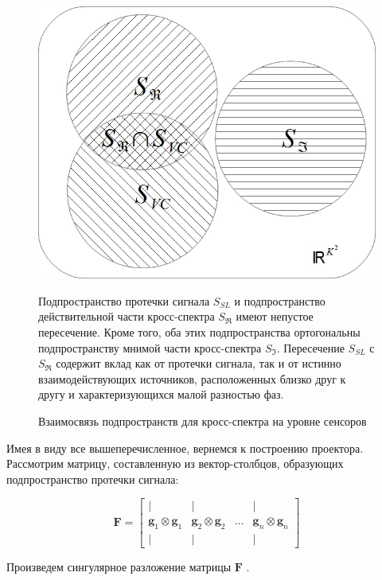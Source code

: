 \begin{figure}[htbp]
\centering
\includegraphics[width=12cm]{./images/SetsReImVC.jpg}
\caption{Взаимосвязь подпространств для кросс-спектра на уровне сенсоров}
\medskip
\small
Подпространство протечки сигнала $S_{SL}$ и подпространство действительной части кросс-спектра $S_{\Re}$
имеют непустое пересечение. Кроме того, оба этих подпространства ортогональны подпространству мнимой
части кросс-спектра $S_{\Im}$.
Пересечение $S_{SL}$ с $S_{\Re}$ содержит вклад как от протечки сигнала,
так и от истинно взаимодействующих источников,
расположенных близко друг к другу и характеризующихся малой разностью фаз.
\label{fig:subspaces}
\end{figure}%
Имея в виду все вышеперечисленное, вернемся к построению проектора.
Рассмотрим матрицу, составленную из вектор-столбцов, образующих подпространство протечки сигнала:

\begin{equation}
    \mathbf{F} =
    \begin{bmatrix}
        |                                 & |                                 &       & |                                 \\
        \mathbf{g}_1 \otimes \mathbf{g}_1 & \mathbf{g}_2 \otimes \mathbf{g}_2 & \dots & \mathbf{g}_n \otimes \mathbf{g}_n \\
        |                                 & |                                 &       & |
    \end{bmatrix}
\end{equation}

Произведем сингулярное разложение матрицы $\mathbf{F}$ \cite{Golub1996}.


